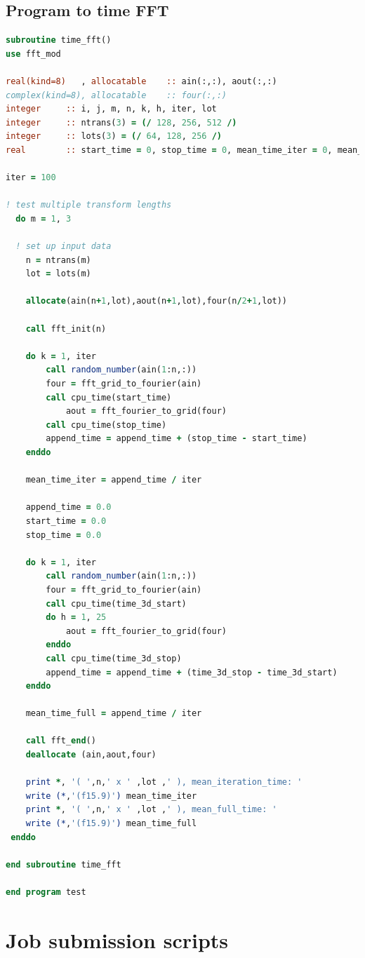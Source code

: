 \documentclass[a4paper,11pt]{report}
\newcommand{\toclesssection}[1]{\section{#1}\addtocounter{section}{1}}
\begin{document}
\toclesssection{Program to time FFT}
\begin{lstlisting}[language=Fortran]
subroutine time_fft()
use fft_mod

real(kind=8)   , allocatable 	:: ain(:,:), aout(:,:)
complex(kind=8), allocatable 	:: four(:,:)
integer 	:: i, j, m, n, k, h, iter, lot
integer 	:: ntrans(3) = (/ 128, 256, 512 /)
integer 	:: lots(3) = (/ 64, 128, 256 /)
real 	    :: start_time = 0, stop_time = 0, mean_time_iter = 0, mean_time_full = 0, append_time = 0, time_3d_start = 0, time_3d_stop = 0

iter = 100

! test multiple transform lengths
  do m = 1, 3

  ! set up input data
    n = ntrans(m)
    lot = lots(m)

    allocate(ain(n+1,lot),aout(n+1,lot),four(n/2+1,lot))

    call fft_init(n)

    do k = 1, iter
        call random_number(ain(1:n,:))
        four = fft_grid_to_fourier(ain)
        call cpu_time(start_time)
            aout = fft_fourier_to_grid(four)
        call cpu_time(stop_time)
        append_time = append_time + (stop_time - start_time)
    enddo

    mean_time_iter = append_time / iter

    append_time = 0.0
    start_time = 0.0
    stop_time = 0.0

    do k = 1, iter
        call random_number(ain(1:n,:))
        four = fft_grid_to_fourier(ain)
        call cpu_time(time_3d_start)
        do h = 1, 25
            aout = fft_fourier_to_grid(four)
        enddo
        call cpu_time(time_3d_stop)
        append_time = append_time + (time_3d_stop - time_3d_start)
    enddo

    mean_time_full = append_time / iter

    call fft_end()
    deallocate (ain,aout,four)

    print *, '( ',n,' x ' ,lot ,' ), mean_iteration_time: '
    write (*,'(f15.9)') mean_time_iter
    print *, '( ',n,' x ' ,lot ,' ), mean_full_time: '
    write (*,'(f15.9)') mean_time_full
 enddo

end subroutine time_fft

end program test
\end{lstlisting}

\chapter{Job submission scripts}
\label{apx:submission}
\end{document}
